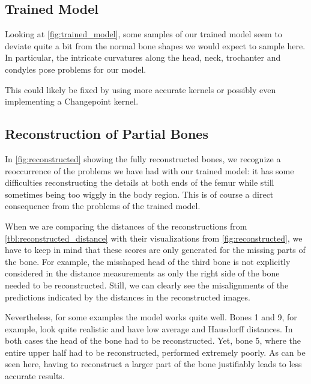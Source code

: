 
\subsection{Trained Model}
\label{subsec:trainedmodeldisc}

Looking at \autoref{fig:trained_model}, some samples of our trained model seem to deviate quite a bit from the normal bone shapes we would expect to sample here. 
In particular, the intricate curvatures along the head, neck, trochanter and condyles pose problems for our model.

This could likely be fixed by using more accurate kernels or possibly even implementing a Changepoint kernel.


\subsection{Reconstruction of Partial Bones}
\label{subsec:reconresultsdisc}

In \autoref{fig:reconstructed} showing the fully reconstructed bones, we recognize a reoccurrence of the problems we have had with our trained model: it has some difficulties reconstructing the details at both ends of the femur while still sometimes being too wiggly in the body region. 
This is of course a direct consequence from the problems of the trained model.

When we are comparing the distances of the reconstructions from \autoref{tbl:reconstructed_distance} with their visualizations from \autoref{fig:reconstructed}, we have to keep in mind that these scores are only generated for the missing parts of the bone. 
For example, the misshaped head of the third bone is not explicitly considered in the distance measurements as only the right side of the bone needed to be reconstructed. 
Still, we can clearly see the misalignments of the predictions indicated by the distances in the reconstructed images.

Nevertheless, for some examples the model works quite well.
Bones 1 and 9, for example, look quite realistic and have low average and Hausdorff distances. 
In both cases the head of the bone had to be reconstructed. 
Yet, bone 5, where the entire upper half had to be reconstructed, performed extremely poorly. 
As can be seen here, having to reconstruct a larger part of the bone justifiably leads to less accurate results.

